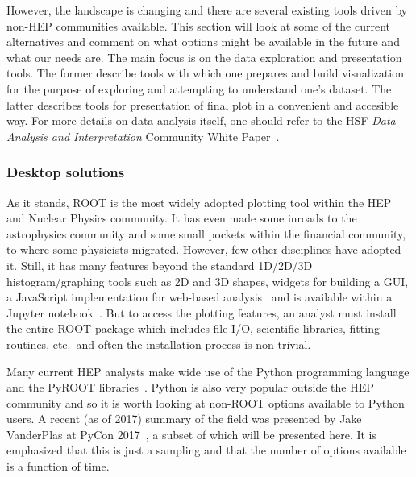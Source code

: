 \documentclass[12pt,a4paper]{article}
\begin{document}
However, the landscape is changing and there are several existing tools driven by non-HEP communities available. This section will look at
some of the current alternatives and comment on what options might be available in the future and what our needs are. The main focus is
on the data exploration and presentation tools. The former describe tools with which one prepares and build visualization for the purpose
of exploring and attempting to understand one's dataset. The latter describes tools for presentation of final plot in a convenient and accesible way.
For more details on data analysis itself, one should refer to the HSF \emph{Data Analysis and Interpretation} Community White Paper~\cite{HSF-CWP-2017-05}.

\hypertarget{stats-desktop}{%
\subsubsection{Desktop solutions}\label{stats-desktop}}

As it stands, ROOT is the most widely adopted plotting tool within the HEP and Nuclear Physics community.
It has even made some inroads to the astrophysics community and some small pockets within the financial community,
to where some physicists migrated. However, few other disciplines have adopted it. Still, it has many features beyond
the standard 1D/2D/3D histogram/graphing tools such as 2D and 3D shapes, widgets for building a GUI, a JavaScript
implementation for web-based analysis~\cite{rootjs} and is available within a Jupyter notebook~\cite{JupyterNotebook}. But to
access the plotting features, an analyst must install the entire ROOT package which includes file I/O, scientific
libraries, fitting routines, etc.\ and often the installation process is non-trivial.

Many current HEP analysts make wide use of the Python programming language and the PyROOT libraries~\cite{PyROOT}.
Python is also very popular outside the HEP community and so it is worth looking at non-ROOT options available to Python users.
A recent (as of 2017) summary of the field was presented by Jake VanderPlas at PyCon 2017~\cite{VanderPlas2017}, a subset
of which will be presented here. It is emphasized that this is just a sampling and that the number of options available
is a function of time.
\end{document}
